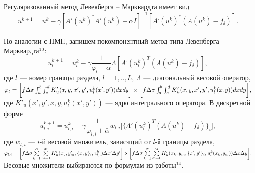 \documentclass[%
autoref,     %
href,        %
facsimile,   %
colorlinks,  %
]{disser}
\begin{document}
Регуляризованный метод Левенберга -- Марквардта имеет вид 
$$u^{k+1}=u^k-\gamma[A'(u^k)^*A'(u^k)+\alpha I]^{-1} [A'(u^k)^*(A(u^k)-f_\delta)].$$

По аналогии с ПМН, запишем покомпонентный метод типа Левенберга -- Марквардта$^{13}$:
$$ u_l^{k+1}=u_l^k-\gamma\frac{1}{\varphi_l+\bar{\alpha}}\Lambda[ A'(u_l^k)^T(A(u^k)-f_\delta)],$$
где $l$ --- номер границы раздела, $l=1,..,L$, $\Lambda$ --- диагональный весовой оператор, 
$\varphi_l=\bigg[ f\Delta\sigma\int_{a}^{b}\int_{c}^{d}
K'_u(x, y, x', y', u_l^k(x',y'))dxdy\bigg] \notag \\ \times\bigg[f\Delta\sigma\int_{a}^{b}\int_{c}^{d}K'_u(x,y, x',y',u_l^k(x,y))dxdy\bigg], $
где $K'_u(x',y', x, y, u_l^k(x',y'))$ --- ядро интегрального оператора. %
{\scriptsize
\let\thefootnote\relax\let\thefootnote\relax{}}
В дискретной форме
\begin{equation*}\label{comp_lm_meth_disc}
u_{l,i}^{k+1}=u_{l,i}^k-\gamma\frac{1}{\varphi_{l,i}+\bar{\alpha}}w_{l,i}\bigg[ \{A'(u_l^k)^T(A(u^k)-f_\delta)\}_i\bigg],
\end{equation*}
где $w_{l,i}$ --- $i$-й весовой множитель, зависящий от $l$-й границы раздела,
$
\varphi_{l,i}=\bigg[ f\Delta\sigma\sum\limits_{k=1}^{N}
\sum\limits_{m=1}^{M}
K'_u(x'_k,y'_m, \{x, y\}_i, u_{l,i}^k) \Delta x' \Delta y'\bigg] \notag \\ \times\bigg[f\Delta\sigma\sum\limits_{k=1}^{N}
\sum\limits_{m=1}^{M}K'_u(x_k,y_m, \{x',y'\}_i,u_l^k(x_k,y_m))\Delta x \Delta y\bigg]. 
$
{\scriptsize
\let\thefootnote\relax\let\thefootnote\relax{}}
Весовые множители выбираются по формулам из работы$^{14}$. 
\end{document}
